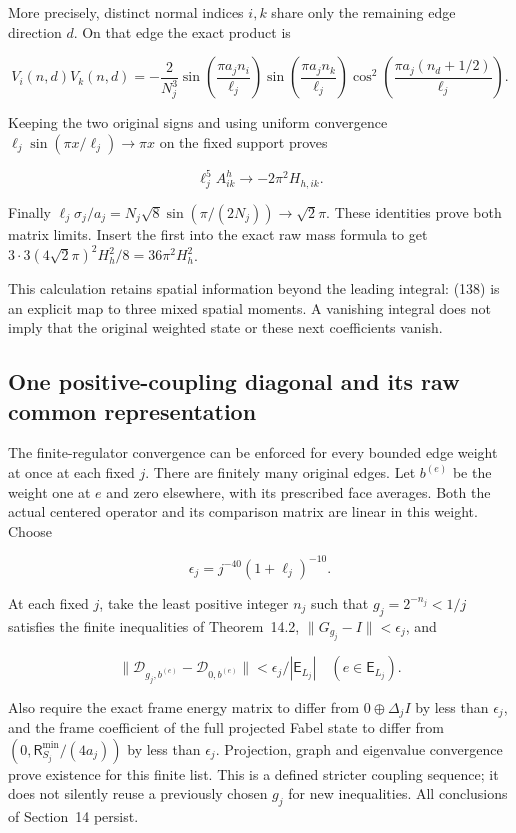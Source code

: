 More precisely, distinct normal indices \(i,k\) share only the remaining
edge direction \(d\). On that edge the exact product is

\[
V_i(n,d)V_k(n,d)=
 -\frac2{N_j^3}
 \sin\left(\frac{\pi a_jn_i}{\ell_j}\right)
 \sin\left(\frac{\pi a_jn_k}{\ell_j}\right)
 \cos^2\left(\frac{\pi a_j(n_d+1/2)}{\ell_j}\right).
\]

Keeping the two original signs and using uniform convergence
\(\ell_j\sin(\pi x/\ell_j)\to\pi x\) on the fixed support proves

\[
\ell_j^5 A^h_{ik}\longrightarrow-2\pi^2H_{h,ik}.
\]

Finally \(\ell_j\sigma_j/a_j=N_j\sqrt8\sin(\pi/(2N_j))
\to\sqrt2\pi\). These identities prove both matrix limits. Insert the
first into the exact raw mass formula to get
\(3\cdot3(4\sqrt2\pi)^2H_h^2/8=36\pi^2H_h^2\).

This calculation retains spatial information beyond the leading
integral: (138) is an explicit map to three mixed spatial moments. A
vanishing integral does not imply that the original weighted state or
these next coefficients vanish.

\subsection{One positive-coupling diagonal and its raw common
representation}\label{local-energy-band-transfer-md-one-positive-coupling-diagonal-and-its-raw-common-representation}

The finite-regulator convergence can be enforced for every bounded edge
weight at once at each fixed \(j\). There are finitely many original
edges. Let \(b^{(e)}\) be the weight one at \(e\) and zero elsewhere,
with its prescribed face averages. Both the actual centered operator and
its comparison matrix are linear in this weight. Choose

\[
\epsilon_j=j^{-40}(1+\ell_j)^{-10}.
\]

At each fixed \(j\), take the least positive integer \(n_j\) such that
\(g_j=2^{-n_j}<1/j\) satisfies the finite inequalities of Theorem~14.2,
\(\|G_{g_j}-I\|<\epsilon_j\), and

\[
\|\mathcal D_{g_j,b^{(e)}}-\mathcal D_{0,b^{(e)}}\|
       <\epsilon_j/|\mathsf E_{L_j}|\quad(e\in\mathsf E_{L_j}).
\]

Also require the exact frame energy matrix to differ from
\(0\oplus\Delta_jI\) by less than \(\epsilon_j\), and the frame
coefficient of the full projected Fabel state to differ from
\((0,\mathsf R_{S_j}^{\min}/(4a_j))\) by less than \(\epsilon_j\).
Projection, graph and eigenvalue convergence prove existence for this
finite list. This is a defined stricter coupling sequence; it does not
silently reuse a previously chosen \(g_j\) for new inequalities. All
conclusions of Section~14 persist.

